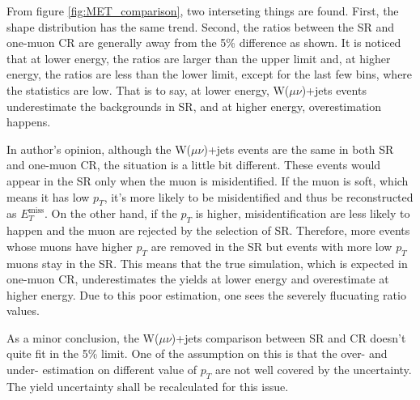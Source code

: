 \documentclass[class=NCU_thesis, crop=false]{standalone}
\begin{document}
		
		From figure \ref{fig:MET_comparison}, two interseting things are found. First, the shape distribution has the same trend. Second, the ratios between the SR and one-muon CR are generally away from the 5\% difference as shown.  It is noticed that at lower energy, the ratios are larger than the upper limit and, at higher energy, the ratios are less than the lower limit, except for the last few bins, where the statistics are low. That is to say, at lower energy, W($\mu \nu$)+jets events underestimate the backgrounds in SR, and at higher energy, overestimation happens.
		
		In author's opinion, although the W($\mu \nu$)+jets events are the same in both SR and one-muon CR, the situation is a little bit different. These events would appear in the SR only when the muon is misidentified. If the muon is soft, which means it has low $p_T$, it's more likely to be misidentified and thus be reconstructed as $E_T^{\mathrm{miss}}$. On the other hand, if the $p_T$ is higher, misidentification are less likely to happen and the muon are rejected by the selection of SR. Therefore, more events whose muons have higher $p_T$ are removed in the SR but events with more low $p_T$ muons stay in the SR. This means that the true simulation, which is expected in one-muon CR, underestimates the yields at lower energy and overestimate at higher energy. Due to this poor estimation, one sees the severely flucuating ratio values.
		
		As a minor conclusion, the W($\mu \nu$)+jets comparison between SR and CR doesn't quite fit in the 5\% limit. One of the assumption on this is that the over- and under- estimation on different value of $p_T$ are not well covered by the uncertainty. The yield uncertainty shall be recalculated for this issue.
		
\end{document}
